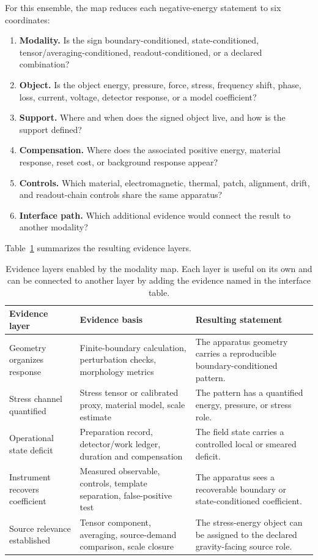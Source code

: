 \documentclass[11pt]{article}
\newcommand{\Tab}{Table}
\begin{document}
For this ensemble, the map reduces each negative-energy statement to six
coordinates:
\begin{enumerate}
\item \textbf{Modality.} Is the sign boundary-conditioned, state-conditioned,
tensor/averaging-conditioned, readout-conditioned, or a declared combination?
\item \textbf{Object.} Is the object energy, pressure, force, stress,
frequency shift, phase, loss, current, voltage, detector response, or a model
coefficient?
\item \textbf{Support.} Where and when does the signed object live, and how is
the support defined?
\item \textbf{Compensation.} Where does the associated positive energy,
material response, reset cost, or background response appear?
\item \textbf{Controls.} Which material, electromagnetic, thermal, patch,
alignment, drift, and readout-chain controls share the same apparatus?
\item \textbf{Interface path.} Which additional evidence would connect the
result to another modality?
\end{enumerate}

\Tab~\ref{tab:claimlevels} summarizes the resulting evidence layers.

\begin{table}[h]
\centering
\small
\begin{tabularx}{\textwidth}{p{}p{}X}
\toprule
Evidence layer & Evidence basis & Resulting statement \\
\midrule
Geometry organizes response &
Finite-boundary calculation, perturbation checks, morphology metrics &
The apparatus geometry carries a reproducible boundary-conditioned pattern. \\
\addlinespace
Stress channel quantified &
Stress tensor or calibrated proxy, material model, scale estimate &
The pattern has a quantified energy, pressure, or stress role. \\
\addlinespace
Operational state deficit &
Preparation record, detector/work ledger, duration and compensation &
The field state carries a controlled local or smeared deficit. \\
\addlinespace
Instrument recovers coefficient &
Measured observable, controls, template separation, false-positive test &
The apparatus sees a recoverable boundary or state-conditioned coefficient. \\
\addlinespace
Source relevance established &
Tensor component, averaging, source-demand comparison, scale closure &
The stress-energy object can be assigned to the declared gravity-facing source
role. \\
\bottomrule
\end{tabularx}
\caption{Evidence layers enabled by the modality map. Each layer is useful on
its own and can be connected to another layer by adding the evidence named in
the interface table.}
\label{tab:claimlevels}
\end{table}
\end{document}
